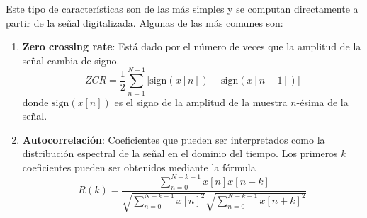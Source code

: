 Este tipo de características son de las más simples y se computan directamente a partir de la señal digitalizada.
Algunas de las más comunes son:

\begin{enumerate}
    \item \textbf{Zero crossing rate}: Está dado por el número de veces que la amplitud de la señal cambia de signo.
    \[
        ZCR = \frac{1}{2}\sum_{n=1}^{N-1}{|\text{sign}(x[n]) - \text{sign}(x[n-1])|}
    \]
    donde $\text{sign}(x[n])$ es el signo de la amplitud de la muestra $n$-ésima de la señal.
    \item \textbf{Autocorrelación}: Coeficientes que pueden ser interpretados como la distribución espectral de la señal en el dominio del tiempo.
    Los primeros $k$ coeficientes pueden ser obtenidos mediante la fórmula
    \[
        R(k) = \frac{\sum_{n=0}^{N-k-1}{x[n]x[n+k]}}{\sqrt{\sum_{n=0}^{N-k-1}{x[n]^2}}\sqrt{\sum_{n=0}^{N-k-1}{x[n+k]^2}}}
    \]
\end{enumerate}
